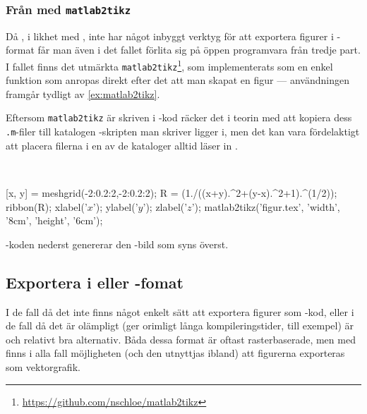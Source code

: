 \documentclass[10pt,../../a4.tex]{subfiles}
\begin{document}
\subsubsection{Från \MATLAB med \texttt{matlab2tikz}}
\label{sec:matlab2tikz}
Då \MATLAB, i likhet med \Rlogo, inte har något inbyggt verktyg för att
exportera figurer i \PGFTikZ-format får man även i det fallet förlita sig
på öppen programvara från tredje part. I fallet \MATLAB finns det utmärkta
\texttt{matlab2tikz}\footnote{\url{https://github.com/nschloe/matlab2tikz}},
som implementerats som en enkel funktion som anropas direkt efter det
att man skapat en figur — användningen framgår tydligt av \cref{ex:matlab2tikz}.

Eftersom \texttt{matlab2tikz} är skriven i \MATLAB-kod räcker det i
teorin med att kopiera dess \texttt{.m}-filer till katalogen
\MATLAB-skripten man skriver ligger i, men det kan vara fördelaktigt att
placera filerna i en av de kataloger \MATLAB alltid läser in
\parencite{MATLAB13:path}.

\begin{kod}[tbp]
	\centering
	\begin{minipage}{\textwidth}
		\centering
		
	\end{minipage}
	\\[2ex]
	\begin{minipage}{\textwidth}
		\begin{matlabcode}
[x, y] = meshgrid(-2:0.2:2,-2:0.2:2);
R = (1./((x+y).^2+(y-x).^2+1).^(1/2));
ribbon(R);
xlabel('$x$'); ylabel('$y$'); zlabel('$z$');
matlab2tikz('figur.tex', 'width', '8cm', 'height', '6cm');
		\end{matlabcode}
	\end{minipage}
	\caption{\MATLAB-koden nederst genererar den \PGFTikZ-bild som
	syns överst.}
	\label{ex:matlab2tikz}
\end{kod}

\subsection{Exportera i \PDF eller \PNG-fomat}
I de fall då det inte finns något enkelt sätt att exportera figurer som
\PGFTikZ-kod, eller i de fall då det är olämpligt (ger orimligt långa
kompileringstider, till exempel) är \PDF och \PNG relativt bra alternativ.
Båda dessa format är oftast rasterbaserade, men med \PDF finns i alla 
fall möjligheten (och den utnyttjas ibland) att figurerna exporteras
som vektorgrafik.
\end{document}
